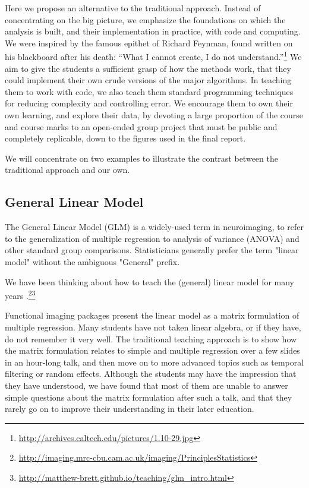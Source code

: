 Here we propose an alternative to the traditional approach.  Instead of
concentrating on the big picture, we emphasize the foundations on which the
analysis is built, and their implementation in practice, with code and
computing.  We were inspired by the famous epithet of Richard Feynman, found
written on his blackboard after his death: ``What I cannot create, I do not
understand.''\footnote{\url{http://archives.caltech.edu/pictures/1.10-29.jpg}}
We aim to give the students a sufficient grasp of how the methods work, that
they could implement their own crude versions of the major algorithms.  In
teaching them to work with code, we also teach them standard programming
techniques for reducing complexity and controlling error.  We encourage them
to own their own learning, and explore their data, by devoting a large
proportion of the course and course marks to an open-ended group project that
must be public and completely replicable, down to the figures used in the
final report.

We will concentrate on two examples to illustrate the contrast between the
traditional approach and our own.

\subsection{General Linear Model}

The General Linear Model (GLM) is a widely-used term in neuroimaging, to refer
to the generalization of multiple regression to analysis of variance (ANOVA)
and other standard group comparisons.  Statisticians generally prefer the term
"linear model" without the ambiguous "General" prefix.

We have been thinking about how to teach the (general) linear model for many
years
\citep{poline2012general}.\footnote{\url{http://imaging.mrc-cbu.cam.ac.uk/imaging/PrinciplesStatistics}}\footnote{\label{glm_intro}
\url{http://matthew-brett.github.io/teaching/glm_intro.html}}

Functional imaging packages present the linear model as a matrix formulation
of multiple regression.  Many students have not taken linear algebra, or if
they have, do not remember it very well.  The traditional teaching approach is
to show how the matrix formulation relates to simple and multiple regression
over a few slides in an hour-long talk, and then move on to more advanced
topics such as temporal filtering or random effects.  Although the students
may have the impression that they have understood, we have found that most of
them are unable to answer simple questions about the matrix formulation after
such a talk, and that they rarely go on to improve their understanding in
their later education.

